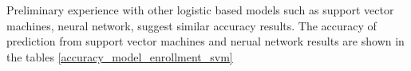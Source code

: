 \documentclass[12pt,english]{report}
\begin{document}

Preliminary experience with other logistic based models such as support vector machines, neural network,  suggest similar accuracy results. The accuracy of prediction from support vector machines and nerual network results are shown in the tables \ref{accuracy_model_enrollment_svm} %
\end{document}

